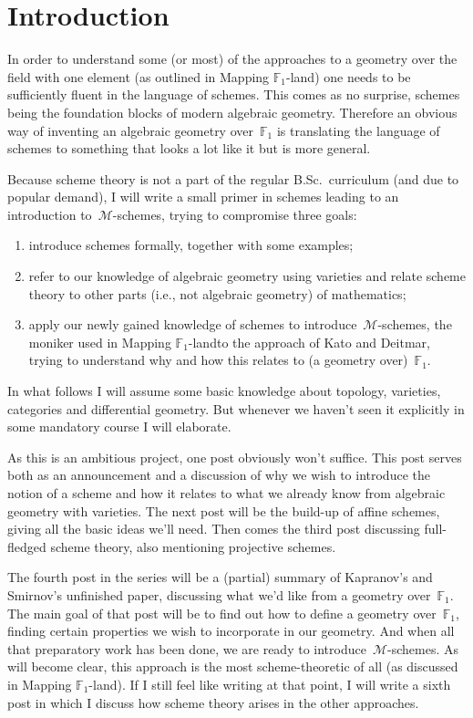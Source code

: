 \section*{Introduction}

In order to understand some (or most) of the approaches to a geometry over the field with one element (as outlined in \iftex\cite{mapping-fun}\fi\ifblog Mapping $\mathbb{F}_{1}$-land\fi) one needs to be sufficiently fluent in the language of schemes. This comes as no surprise, schemes being the foundation blocks of modern algebraic geometry. Therefore an obvious way of inventing an algebraic geometry over~$\mathbb{F}_1$ is translating the language of schemes to something that looks a lot like it but is more general.

Because scheme theory is not a part of the regular B.Sc.\ curriculum (and due to popular demand), I will write a small primer in schemes leading to an introduction to~$\mathcal{M}$-schemes, trying to compromise three goals:
\begin{enumerate}
  \item introduce schemes formally, together with some examples;
  \item refer to our knowledge of algebraic geometry using varieties and relate scheme theory to other parts (i.e., not algebraic geometry) of mathematics;
  \item apply our newly gained knowledge of schemes to introduce~$\mathcal{M}$-schemes, the moniker used in \iftex\cite{mapping-fun}\fi\ifblog Mapping $\mathbb{F}_1$-land\fi to the approach of Kato and Deitmar, trying to understand why and how this relates to (a geometry over)~$\mathbb{F}_1$.
\end{enumerate}

In what follows I will assume some basic knowledge about topology, varieties, categories and differential geometry. But whenever we haven't seen it explicitly in some mandatory course I will elaborate.

As this is an ambitious project, one post obviously won't suffice. This post serves both as an announcement and a discussion of why we wish to introduce the notion of a scheme and how it relates to what we already know from algebraic geometry with varieties. The next post will be the build-up of affine schemes, giving all the basic ideas we'll need. Then comes the third post discussing full-fledged scheme theory, also mentioning projective schemes.

The fourth post in the series will be a (partial) summary of \iftex\cite{kapranov-smirnov}\fi\ifblog Kapranov's and Smirnov's unfinished paper\fi, discussing what we'd like from a geometry over~$\mathbb{F}_1$. The main goal of that post will be to find out how to define a geometry over~$\mathbb{F}_1$, finding certain properties we wish to incorporate in our geometry. And when all that preparatory work has been done, we are ready to introduce~$\mathcal{M}$-schemes. As will become clear, this approach is the most scheme-theoretic of all (as discussed in \iftex\cite{mapping-fun}\fi\ifblog Mapping $\mathbb{F}_{1}$-land\fi). If I still feel like writing at that point, I will write a sixth post in which I discuss how scheme theory arises in the other approaches.
